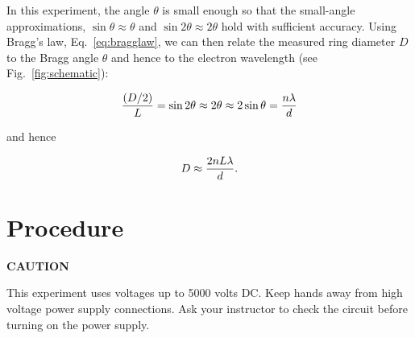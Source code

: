 In this experiment, the angle ${\theta}$ is small enough so that the small-angle
approximations, $\sin\theta \approx \theta$ and $\sin2\theta \approx 2\theta$
hold with sufficient accuracy.  Using Bragg's law, Eq.~\ref{eq:bragglaw}, we can
then relate the measured ring diameter $D$ to the Bragg angle $\theta$ and hence
to the electron wavelength (see Fig.~\ref{fig:schematic}):
 
\begin{equation}
{ (D/2) \over L } = \sin2\theta \approx 2\theta \approx 2\sin\theta = \frac{n\lambda}{d}
\end{equation}

and hence

\begin{equation}
D \approx {2nL\lambda\over d}.
\end{equation}

\section{Procedure }

\begin{centering}
{\bf CAUTION}
\end{centering}

\noindent This experiment uses voltages up to 5000 volts DC.  Keep hands away
from high voltage power supply connections.  Ask your instructor to check the
circuit before turning on the power supply.

